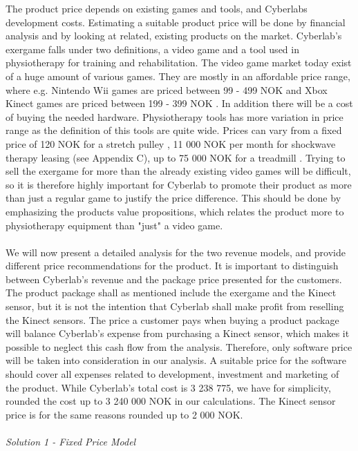 The product price depends on existing games and tools, and Cyberlabs development costs. Estimating a suitable product price will be done by financial analysis and by looking at related, existing products on the market. Cyberlab's exergame falls under two definitions, a video game and a tool used in physiotherapy for training and rehabilitation. The video game market today exist of a huge amount of various games. They are mostly in an affordable price range, where e.g. Nintendo Wii games are priced between 99 - 499 NOK \cite{elkjopwii} and Xbox Kinect games are priced between 199 - 399 NOK \cite{elkjopkinect}. In addition there will be a cost of buying the needed hardware. Physiotherapy tools has more variation in price range as the definition of this tools are quite wide. Prices can vary from a fixed price of 120 NOK for a stretch pulley \cite{stretchpulley}, 11 000 NOK per month for shockwave therapy leasing (see Appendix C), up to 75 000 NOK for a treadmill \cite{treadmill}. Trying to sell the exergame for more than the already existing video games will be difficult, so it is therefore highly important for Cyberlab to promote their product as more than just a regular game to justify the price difference. This should be done by emphasizing the products value propositions, which relates the product more to physiotherapy equipment than "just" a video game. \\ \\
We will now present a detailed analysis for the two revenue models, and provide different price recommendations for the product. It is important to distinguish between Cyberlab's revenue and the package price presented for the customers. The product package shall as mentioned include the exergame and the Kinect sensor, but it is not the intention that Cyberlab shall make profit from reselling the Kinect sensors. The price a customer pays when buying a product package will balance Cyberlab's expense from purchasing a Kinect sensor, which makes it possible to neglect this cash flow from the analysis. Therefore, only software price will be taken into consideration in our analysis. A suitable price for the software should cover all expenses related to development, investment and marketing of the product. While Cyberlab's total cost is 3 238 775, we have for simplicity,  rounded the cost up to 3 240 000 NOK in our calculations. The Kinect sensor price is for the same reasons rounded up to 2 000 NOK. \\ \\ 
\emph{Solution 1 - Fixed Price Model}\\ \\
